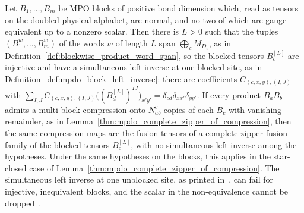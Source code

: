 \begin{lemma}%
    \label{thm:mpdo_complete_zipper_of_compression_blocked}
    \leanok
    Let $B_1,\ldots,B_m$ be MPO blocks of positive bond dimension which,
    read as tensors on the doubled physical alphabet, are normal, and no two
    of which are gauge equivalent up to a nonzero scalar. Then there is $L>0$
    such that the tuples $(B_1^w,\ldots,B_m^w)$ of the words $w$ of length
    $L$ span $\bigoplus_cM_{D_c}$, as in
    Definition~\ref{def:blockwise_product_word_span}, so the blocked tensors
    $B_c^{[L]}$ are injective and have a simultaneous left inverse at one blocked site, as in
    Definition~\ref{def:mpdo_block_left_inverse}: there are coefficients
    $C_{(c,x,y),(I,J)}$ with
    $\sum_{I,J}C_{(c,x,y),(I,J)}\bigl((B_d^{[L]})^{IJ}\bigr)_{x'y'}
        =\delta_{cd}\delta_{xx'}\delta_{yy'}$. If
    every product $B_aB_b$ admits a multi-block compression onto $N_{ab}^c$
    copies of each $B_c$ with vanishing remainder, as in
    Lemma~\ref{thm:mpdo_complete_zipper_of_compression}, then the same
    compression maps are the fusion tensors of a complete zipper fusion
    family of the blocked tensors $B_c^{[L]}$, with no simultaneous left
    inverse among the hypotheses. Under the same hypotheses on the blocks,
    this applies in the star-closed case of
    Lemma~\ref{thm:mpdo_complete_zipper_of_compression}.
    The simultaneous left inverse at one unblocked site, as printed
    in~\cite[line~269]{Bultinck2017Anyons}, can fail for injective,
    inequivalent blocks, and the scalar in the non-equivalence cannot be
    dropped~\cite{gap:bmwshv17_joint_block_left_inverse}.
\end{lemma}
